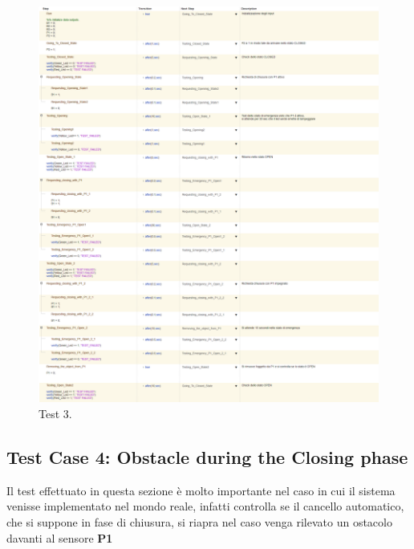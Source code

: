 \documentclass[12pt]{article}
\begin{document}
\begin{figure}[H]
    
    \hspace{-2.3cm} %
    \includegraphics[width=1.3\textwidth]{Immagini_Test/Test_3_img.PNG}
    \caption{Test 3.}
    \label{fig:Test_3}
\end{figure}


\subsection{Test Case 4: Obstacle during the Closing phase}

Il test effettuato in questa sezione è molto importante nel caso in cui il sistema venisse implementato nel mondo reale, infatti controlla se il cancello automatico, che si suppone in fase di chiusura, si riapra nel caso venga rilevato un ostacolo davanti al sensore \textbf{P1}
\end{document}
